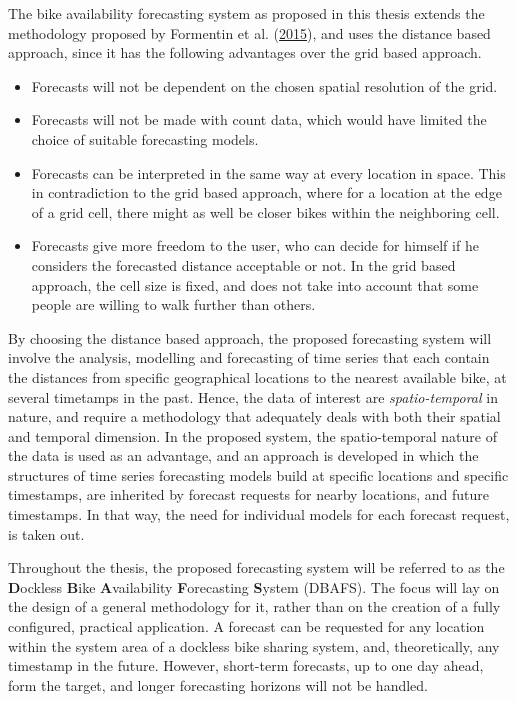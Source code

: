 \documentclass[12pt,oneside]{reedthesis}
\providecommand{\tightlist}{%
  \setlength{\itemsep}{0pt}\setlength{\parskip}{0pt}}
\begin{document}
The bike availability forecasting system as proposed in this thesis
extends the methodology proposed by Formentin et al.
(\protect\hyperlink{ref-formentin2015}{2015}), and uses the distance
based approach, since it has the following advantages over the grid
based approach.
\begin{itemize}
\tightlist
\item
  Forecasts will not be dependent on the chosen spatial resolution of
  the grid.
\item
  Forecasts will not be made with count data, which would have limited
  the choice of suitable forecasting models.
\item
  Forecasts can be interpreted in the same way at every location in
  space. This in contradiction to the grid based approach, where for a
  location at the edge of a grid cell, there might as well be closer
  bikes within the neighboring cell.
\item
  Forecasts give more freedom to the user, who can decide for himself if
  he considers the forecasted distance acceptable or not. In the grid
  based approach, the cell size is fixed, and does not take into account
  that some people are willing to walk further than others.
\end{itemize}
By choosing the distance based approach, the proposed forecasting system
will involve the analysis, modelling and forecasting of time series that
each contain the distances from specific geographical locations to the
nearest available bike, at several timetamps in the past. Hence, the
data of interest are \emph{spatio-temporal} in nature, and require a
methodology that adequately deals with both their spatial and temporal
dimension. In the proposed system, the spatio-temporal nature of the
data is used as an advantage, and an approach is developed in which the
structures of time series forecasting models build at specific locations
and specific timestamps, are inherited by forecast requests for nearby
locations, and future timestamps. In that way, the need for individual
models for each forecast request, is taken out.

Throughout the thesis, the proposed forecasting system will be referred
to as the \textbf{D}ockless \textbf{B}ike \textbf{A}vailability
\textbf{F}orecasting \textbf{S}ystem (DBAFS). The focus will lay on the
design of a general methodology for it, rather than on the creation of a
fully configured, practical application. A forecast can be requested for
any location within the system area of a dockless bike sharing system,
and, theoretically, any timestamp in the future. However, short-term
forecasts, up to one day ahead, form the target, and longer forecasting
horizons will not be handled.
\end{document}
